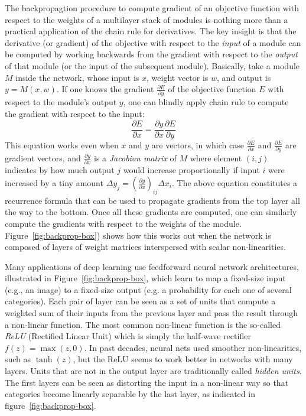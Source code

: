 \documentclass[10pts]{article}
\newcommand{\deri}[2]{\frac{\partial  #1}{\partial #2}}
\begin{document}
The backpropagtion procedure to compute gradient of an objective
function with respect to the weights of a multilayer stack of modules
is nothing more than a practical application of the chain rule for
derivatives. The key insight is that the derivative (or gradient) of
the objective with respect to the {\it input} of a module can be
computed by working backwards from the gradient with respect to the
{\em output} of that module (or the input of the subsequent
module). Basically, take a module $M$ inside the network, whose input
is $x$, weight vector is $w$, and output is $y = M(x,w)$. If one knows
the gradient $\deri{E}{y}$ of the objective function $E$ with respect
to the module's output $y$, one can blindly apply chain rule to
compute the gradient with respect to the input:
\[
  \deri{E}{x} = \deri{y}{x}\deri{E}{y}
\]
This equation works even when $x$ and $y$ are vectors, in which case
$\deri{E}{x}$ and $\deri{E}{y}$ are gradient vectors, and
$\deri{y}{x}$ is a {\em Jacobian matrix} of $M$ where element $(i,j)$
indicates by how much output $j$ would increase proportionally if
input $i$ were increased by a tiny amount $\Delta y_j =
\left(\deri{y}{x}\right)_{ij} \Delta x_i$. The above equation
constitutes a recurrence formula that can be used to propagate
gradients from the top layer all the way to the bottom. Once all these
gradients are computed, one can similarly compute the gradients with
respect to the weights of the module. Figure~\ref{fig:backprop-box})
shows how this works out when the network is composed of layers of
weight matrices interspersed with scalar non-linearities.


Many applications of deep learning use feedforward neural network
architectures, illustrated in Figure~\ref{fig:backprop-box}, which
learn to map a fixed-size input (e.g., an image) to a fixed-size
output (e.g. a probability for each one of several categories). Each
pair of layer can be seen as a set of units that compute a weighted
sum of their inputs from the previous layer and pass the result
through a non-linear function. The most common non-linear function is
the so-called {\em ReLU} (Rectified Linear Unit) which is simply the
half-wave rectifier $f(z) = \max(z,0)$. In past decades, neural nets
used smoother non-linearities, such as $\tanh(z)$, but the ReLU seems
to work better in networks with many layers. Units that are not in the
output layer are traditionally called {\em hidden units}. The first
layers can be seen as distorting the input in a non-linear way so that
categories become linearly separable by the last layer, as indicated
in figure~\ref{fig:backprop-box}.
\end{document}
